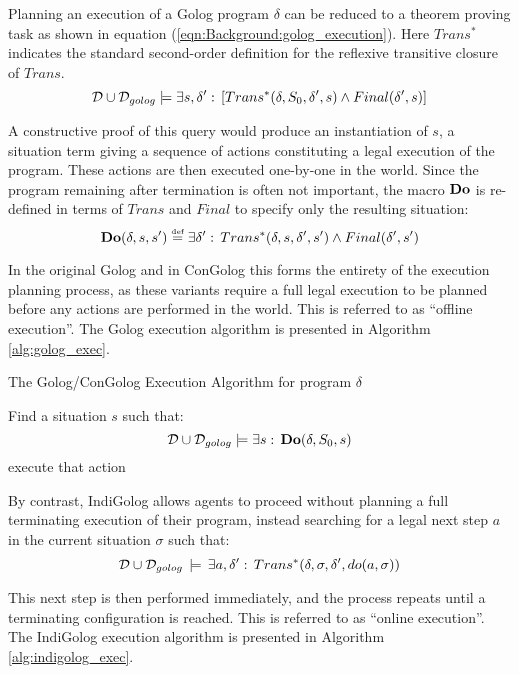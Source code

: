 Planning an execution of a Golog program $\delta$ can be reduced
to a theorem proving task as shown in equation (\ref{eqn:Background:golog_execution}).
Here $Trans^{*}$ indicates the standard second-order definition for
the reflexive transitive closure of $Trans$.\begin{equation}
\mathcal{D}\cup\mathcal{D}_{golog}\models\exists s,\delta':\,\left[Trans^{*}(\delta,S_{0},\delta',s)\wedge Final(\delta',s)\right]\label{eqn:Background:golog_execution}\end{equation}


A constructive proof of this query would produce an instantiation
of $s$, a situation term giving a sequence of actions constituting
a legal execution of the program. These actions are then executed
one-by-one in the world. Since the program remaining after termination
is often not important, the macro $\mathbf{Do}$ is re-defined in terms of
$Trans$ and $Final$ to specify only the resulting situation:\[
\mathbf{Do}(\delta,s,s')\stackrel{\mbox{\tiny def}}{=}\exists\delta':\, Trans^{*}(\delta,s,\delta',s')\wedge Final(\delta',s')\]


In the original Golog and in ConGolog this forms the entirety of the
execution planning process, as these variants require a full legal
execution to be planned before any actions are performed in the world.
This is referred to as {}``offline execution''. The Golog execution
algorithm is presented in Algorithm \ref{alg:golog_exec}.

%
\begin{algorithm}[t]
\caption{The Golog/ConGolog Execution Algorithm for program $\delta$}


\label{alg:golog_exec} \begin{algorithmic} \STATE Find a situation
$s$ such that:\[
\mathcal{D}\cup\mathcal{D}_{golog}\models\exists s:\,\mathbf{Do}(\delta,S_{0},s)\]
  \STATE execute
that action \ENDFOR \end{algorithmic} 
\end{algorithm}


By contrast, IndiGolog allows agents to proceed without planning a
full terminating execution of their program, instead searching for
a legal next step $a$ in the current situation $\sigma$ such that:\[
\mathcal{D}\cup\mathcal{D}_{golog}\,\models\,\exists a,\delta':\, Trans^{*}(\delta,\sigma,\delta',do(a,\sigma))\]


This next step is then performed immediately, and the process repeats
until a terminating configuration is reached. This is referred to
as {}``online execution''. The IndiGolog execution algorithm is
presented in Algorithm \ref{alg:indigolog_exec}.

